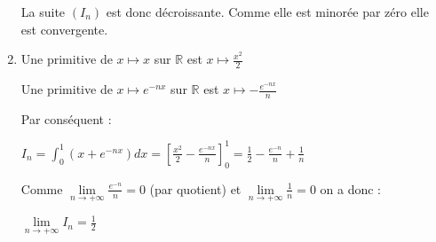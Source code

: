 \begin{corrige}
\begin{enumerate}
          \par
          La suite $\left(I_{n}\right)$ est donc décroissante. Comme elle est minorée par zéro elle est convergente.
          \item
          Une primitive de $x\mapsto x$ sur $\mathbb{R}$ est $x\mapsto \frac{x^{2}}{2}$
          \par
          Une primitive de $x\mapsto e^{-nx}$ sur $\mathbb{R}$ est $x\mapsto -\frac{e^{-nx}}{n}$
          \par
          Par conséquent :
          \par
          $I_{n}=\int_{0}^{1}\left(x+e^{-nx}\right) dx = \left[\frac{x^{2}}{2}-\frac{e^{-nx}}{n}\right]_{0}^{1} = \frac{1}{2}-\frac{e^{-n}}{n}+\frac{1}{n}$
          \par
          Comme $\lim\limits_{n\rightarrow +\infty }\frac{e^{-n}}{n}=0$ (par quotient) et  $\lim\limits_{n\rightarrow +\infty }\frac{1}{n}=0$ on a donc :
          \begin{center}$\lim\limits_{n\rightarrow +\infty }I_{n}=\frac{1}{2}$\end{center}
     \end{enumerate}
\end{corrige}
